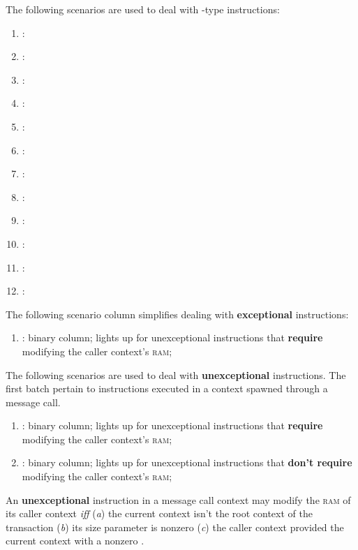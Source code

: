The following scenarios are used to deal with -type instructions:
\begin{enumerate}[resume]
	\item \scenCreateException:
	\item \scenCreateAbort:
	\item \scenCreateFCondHasCodeWontRevert:
	\item \scenCreateFCondHasCodeWillRevert:
	\item \scenCreateFCondHasNonceWontRevert:
	\item \scenCreateFCondHasNonceWillRevert:
	\item \scenCreateWithInitCodeCurrWontRevertChildFailure:
	\item \scenCreateWithInitCodeCurrWontRevertChildSuccess:
	\item \scenCreateWithInitCodeCurrWillRevertChildFailure:
	\item \scenCreateWithInitCodeCurrWillRevertChildSuccess:
	\item \scenCreateSansInitCodeCurrWontRevert:
	\item \scenCreateSansInitCodeCurrWillRevert:
\end{enumerate}

The following scenario column simplifies dealing with \textbf{exceptional}  instructions: 
\begin{enumerate}[resume]
	\item \scenReturnException:
		binary column;
		lights up for unexceptional  instructions that \textbf{require} modifying the caller context's \textsc{ram};
\end{enumerate}
The following scenarios are used to deal with \textbf{unexceptional}  instructions.
The first batch pertain to  instructions executed in a context spawned through a message call.
\begin{enumerate}[resume]
	\item \scenReturnFromMessageCallWillTouchRam:
		binary column;
		lights up for unexceptional  instructions that \textbf{require} modifying the caller context's \textsc{ram};
	\item \scenReturnFromMessageCallWontTouchRam:
		binary column;
		lights up for unexceptional  instructions that \textbf{don't require} modifying the caller context's \textsc{ram};
\end{enumerate}
\saNote{} An \textbf{unexceptional}  instruction in a message call context may modify the \textsc{ram} of its caller context \emph{iff}
(\emph{a}) the current context isn't the root context of the transaction
(\emph{b}) its size parameter is nonzero
(\emph{c}) the caller context provided the current context with a nonzero \rac{}.

